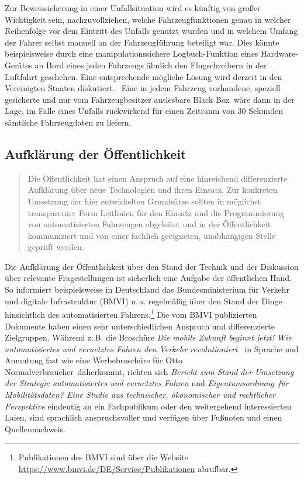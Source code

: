 \documentclass[twoside,a4paper,12pt]{article}
\begin{document}
Zur Beweissicherung in einer Unfallsituation wird es künftig von großer Wichtigkeit sein, nachzuvollziehen, welche Fahrzeugfunktionen genau in welcher 
Reihenfolge vor dem Eintritt des Unfalls genutzt wurden und in welchem Umfang der Fahrer selbst manuell an der Fahrzeugführung beteiligt war. Dies 
könnte beispielsweise durch eine manipulationssichere Logbuch-Funktion eines Hardware-Gerätes an Bord eines jeden Fahrzeugs ähnlich den Flugschreibern 
in der Luftfahrt geschehen. Eine entsprechende mögliche Lösung wird derzeit in den Vereinigten Staaten diskutiert.~\cite{epic} Eine in jedem Fahrzeug
vorhandene, speziell gesicherte und nur vom Fahrzeugbesitzer auslesbare \glqq Black Box\grqq\ wäre dann in der Lage, im Falle eines Unfalls rückwirkend 
für einen Zeitraum von 30 Sekunden sämtliche Fahrzeugdaten zu liefern.\\

\subsection{Aufklärung der Öffentlichkeit} \label{AufklaerungDerOeffentlichkeit}

\begin{quote}
\glqq
Die Öffentlichkeit hat einen Anspruch auf eine hinreichend differenzierte Aufklärung
über neue Technologien und ihren Einsatz. Zur konkreten Umsetzung der hier entwickelten Grundsätze sollten in möglichst 
transparenter Form Leitlinien für den Einsatz und die
Programmierung von automatisierten Fahrzeugen abgeleitet und in der Öffentlichkeit
kommuniziert und von einer fachlich geeigneten, unabhängigen Stelle geprüft werden.\grqq\mbox{~\cite[S. 12]{ek}}
\end{quote}

Die Aufklärung der Öffentlichkeit über den Stand der Technik und der Diskussion über relevante Fragestellungen ist sicherlich eine Aufgabe der öffentlichen
Hand. 
So informiert beispielsweise in Deutschland das Bundesministerium für Verkehr und digitale Infrastruktur (BMVI) u.\,a. regelmäßig über den Stand der Dinge hinsichtlich
des automatisierten Fahrens.\footnote{Publikationen des BMVI sind über die Website \url{https://www.bmvi.de/DE/Service/Publikationen} abrufbar.} Die vom
BMVI publizierten Dokumente haben einen sehr unterschiedlichen Anspruch und differenzierte Zielgruppen. Während z.\,B. die Broschüre \textit{Die mobile 
Zukunft beginnt jetzt! Wie automatisiertes und vernetztes Fahren den Verkehr revolutioniert}~\cite{bmvi3} in Sprache und Anmutung fast wie eine Werbebroschüre 
für \glqq Otto Normalverbraucher\grqq\ daherkommt, richten sich \textit{Bericht zum Stand der Umsetzung der Strategie automatisiertes und vernetztes 
Fahren} und \textit{\glqq Eigentumsordnung\grqq\ für Mobilitätsdaten? Eine Studie aus technischer, ökonomischer und rechtlicher Perspektive} eindeutig an ein
Fachpublikum oder den weitergehend interessierten Laien, sind sprachlich anspruchsvoller und verfügen über Fußnoten und einen Quellennachweis.
\end{document}
